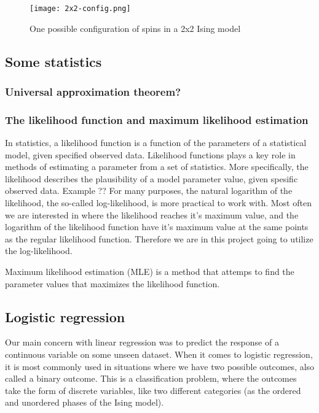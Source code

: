 \documentclass[a4paper,12pt]{article}
\begin{document}
\begin{figure}[h!]
  \centering
  \caption{One possible configuration of spins in a 2x2 Ising model}
  \texttt{[image: 2x2-config.png]}
\end{figure}

\subsection{Some statistics}

\subsubsection{Universal approximation theorem?}

\subsubsection{The likelihood function and maximum likelihood estimation}
In statistics, a likelihood function is a function of the parameters of a statistical model, given specified observed data. Likelihood functions plays a key role in methods of estimating a parameter from a set of statistics. More specifically, the likelihood describes the plausibility of a model parameter value, given spesific observed data. Example ??\newline
For many purposes, the natural logarithm of the likelihood, the so-called log-likelihood, is more practical to work with. Most often we are interested in where the likelihood reaches it's maximum value, and the logarithm of the likelihood function have it's maximum value at the same points as the regular likelihood function. Therefore we are in this project going to utilize the log-likelihood.\newline

Maximum likelihood estimation (MLE) is a method that attemps to find the parameter values that maximizes the likelihood function.



\subsection{Logistic regression}
Our main concern with linear regression was to predict the response of a continuous variable on some unseen dataset. When it comes to logistic regression, it is most commonly used in situations where we have two possible outcomes, also called a binary outcome. This is a classification problem, where the outcomes take the form of discrete variables, like two different categories (as the ordered and unordered phases of the Ising model).
\end{document}

